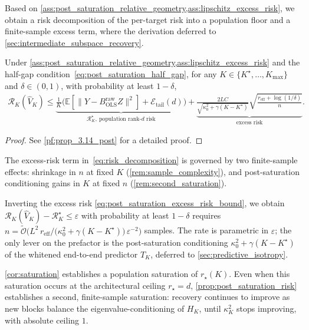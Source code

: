Based on \cref{ass:post_saturation_relative_geometry,ass:lipschitz_excess_risk}, we obtain a risk decomposition of the per-target risk into a population floor and a finite-sample excess term, where the derivation deferred to \cref{sec:intermediate_subspace_recovery}.
\begin{proposition}
\label{prop:post_saturation_risk}
Under \cref{ass:post_saturation_relative_geometry,ass:lipschitz_excess_risk} 
and the half-gap condition~\eqref{eq:post_saturation_half_gap}, for any 
$K \in \{K^\star,\dots,K_{\max}\}$ and $\delta \in (0,1)$, with 
probability at least $1-\delta$,
\begin{align}
\label{eq:risk_decomposition}
\mathcal{R}_K(\widehat V_K) \le
\underbrace{\tfrac{1}{K}\bigl(\mathbb{E}\!\left[\|Y - B_{\mathrm{OLS}}^{\mathrm{raw}} Z\|^2\right] + \mathcal{E}_{\mathrm{tail}}(d)\bigr)}_{\mathcal{R}_K^\star,\ \text{population rank-}d\text{ risk}}
+ \underbrace{\frac{2LC}{\sqrt{\kappa_0^2 + \gamma(K-K^\star)}}\sqrt{\frac{r_{\mathrm{eff}} + \log(1/\delta)}{n}}}_{\text{excess risk}}.
\end{align}
\end{proposition}
\begin{proof}
See \cref{pf:prop_3.14_post} for a detailed proof.
\end{proof}


The excess-risk term in~\eqref{eq:risk_decomposition} is governed by two finite-sample effects: shrinkage in $n$ at fixed $K$ (\cref{rem:sample_complexity}), and post-saturation conditioning gains in $K$ at fixed $n$ (\cref{rem:second_saturation}).


\begin{remark}
\label{rem:sample_complexity}
Inverting the excess risk \eqref{eq:post_saturation_excess_risk_bound},
we obtain $\mathcal{R}_K(\widehat{V}_K) - \mathcal{R}_K^\star \le \varepsilon$
with probability at least $1-\delta$ requires
$n = \tilde{\mathcal{O}}\big(L^2\, r_{\mathrm{eff}} / \big(\kappa_0^2+\gamma(K-K^\star)\big)\,\varepsilon^{-2}\big)$
samples.
The rate is parametric in $\varepsilon$;
the only lever on the prefactor is the post-saturation conditioning
$\kappa_0^2+\gamma(K-K^\star)$ of the whitened end-to-end predictor $T_K$, deferred to \cref{sec:predictive_isotropy}.
\end{remark}


\begin{remark}
\label{rem:second_saturation}
\cref{cor:saturation} establishes a population saturation of $r_\star(K)$. 
Even when this saturation occurs at the architectural ceiling $r_\star = d$, \cref{prop:post_saturation_risk} establishes a second, finite-sample saturation: recovery continues to improve as new blocks balance the eigenvalue-conditioning of $H_K$, until $\kappa_K^2$ stops improving, with absolute ceiling $1$.
\end{remark}

